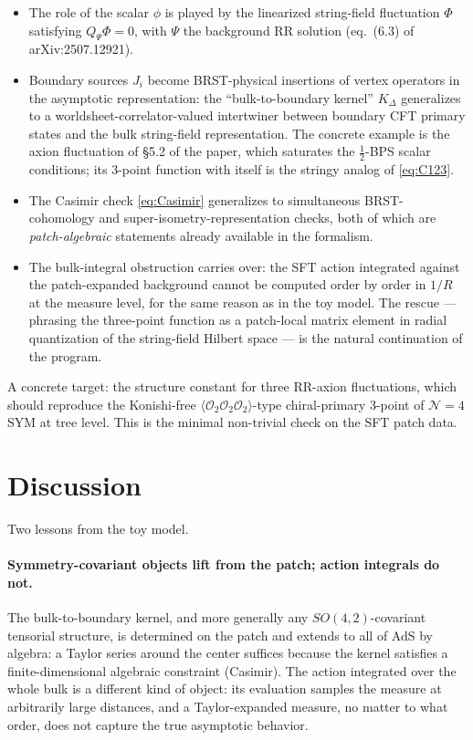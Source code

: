 \documentclass[11pt]{article}
\newcommand{\CFT}{\mathcal{N}{=}4}
\begin{document}
\begin{itemize}
\item The role of the scalar $\phi$ is played by the linearized string-field fluctuation $\Phi$ satisfying $Q_\Psi \Phi = 0$, with $\Psi$ the background RR solution (eq.~(6.3) of arXiv:2507.12921).
\item Boundary sources $J_i$ become BRST-physical insertions of vertex operators in the asymptotic representation: the ``bulk-to-boundary kernel'' $K_\Delta$ generalizes to a worldsheet-correlator-valued intertwiner between boundary CFT primary states and the bulk string-field representation. The concrete example is the axion fluctuation of \S5.2 of the paper, which saturates the $\tfrac12$-BPS scalar conditions; its 3-point function with itself is the stringy analog of \cref{eq:C123}.
\item The Casimir check \cref{eq:Casimir} generalizes to simultaneous BRST-cohomology and super-isometry-representation checks, both of which are \emph{patch-algebraic} statements already available in the formalism.
\item The bulk-integral obstruction carries over: the SFT action integrated against the patch-expanded background cannot be computed order by order in $1/R$ at the measure level, for the same reason as in the toy model. The rescue --- phrasing the three-point function as a patch-local matrix element in radial quantization of the string-field Hilbert space --- is the natural continuation of the program.
\end{itemize}

A concrete target: the structure constant for three RR-axion fluctuations, which should reproduce the Konishi-free $\langle\mathcal{O}_2\mathcal{O}_2\mathcal{O}_2\rangle$-type chiral-primary 3-point of $\CFT$ SYM at tree level. This is the minimal non-trivial check on the SFT patch data.

\section{Discussion}

Two lessons from the toy model.

\paragraph{Symmetry-covariant objects lift from the patch; action integrals do not.} The bulk-to-boundary kernel, and more generally any $SO(4,2)$-covariant tensorial structure, is determined on the patch and extends to all of AdS by algebra: a Taylor series around the center suffices because the kernel satisfies a finite-dimensional algebraic constraint (Casimir). The action integrated over the whole bulk is a different kind of object: its evaluation samples the measure at arbitrarily large distances, and a Taylor-expanded measure, no matter to what order, does not capture the true asymptotic behavior.
\end{document}
